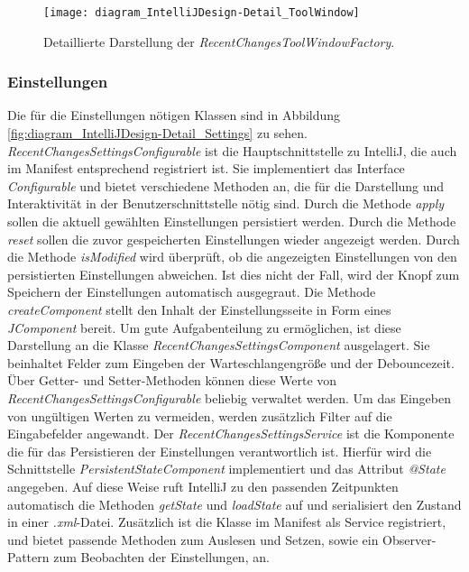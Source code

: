 \begin{figure}
    \centering
    \texttt{[image: diagram\_IntelliJDesign-Detail\_ToolWindow]}
    \caption{Detaillierte Darstellung der \emph{RecentChangesToolWindowFactory}.}
    \label{fig:diagram_IntelliJDesign-Detail_ToolWindow}
\end{figure}

\subsubsection{Einstellungen}

Die für die Einstellungen nötigen Klassen sind in Abbildung
\ref{fig:diagram_IntelliJDesign-Detail_Settings} zu sehen.
\emph{RecentChangesSettingsConfigurable} ist die Hauptschnittstelle 
zu IntelliJ, die auch im Manifest entsprechend registriert ist. 
Sie implementiert das Interface \emph{Configurable}
und bietet verschiedene Methoden an, die für die Darstellung
und Interaktivität in der Benutzerschnittstelle nötig sind.
Durch die Methode \emph{apply} sollen die aktuell gewählten Einstellungen
persistiert werden. Durch die Methode \emph{reset} sollen die 
zuvor gespeicherten Einstellungen wieder angezeigt werden.
Durch die Methode \emph{isModified} wird überprüft, ob die angezeigten
Einstellungen von den persistierten Einstellungen abweichen. 
Ist dies nicht der Fall, wird der Knopf zum Speichern der Einstellungen
automatisch ausgegraut. Die Methode \emph{createComponent} stellt
den Inhalt der Einstellungsseite in Form eines \emph{JComponent} bereit.
Um gute Aufgabenteilung zu ermöglichen, ist diese Darstellung an die 
Klasse \emph{RecentChangesSettingsComponent} ausgelagert. Sie beinhaltet
Felder zum Eingeben der Warteschlangengröße und der Debouncezeit.
Über Getter- und Setter-Methoden können diese Werte von 
\emph{RecentChangesSettingsConfigurable} beliebig verwaltet werden.
Um das Eingeben von ungültigen Werten zu vermeiden, werden zusätzlich
Filter auf die Eingabefelder angewandt.
Der \emph{RecentChangesSettingsService} ist die Komponente die für das 
Persistieren der Einstellungen verantwortlich ist. Hierfür
wird die Schnittstelle \emph{PersistentStateComponent} implementiert
und das Attribut \emph{@State} angegeben. Auf diese Weise ruft
IntelliJ zu den passenden Zeitpunkten automatisch die Methoden
\emph{getState} und \emph{loadState} auf und serialisiert den Zustand
in einer \emph{.xml}-Datei.
Zusätzlich ist die Klasse im Manifest als Service registriert, und bietet
passende Methoden zum Auslesen und Setzen, sowie ein Observer-Pattern
zum Beobachten der Einstellungen, an.

